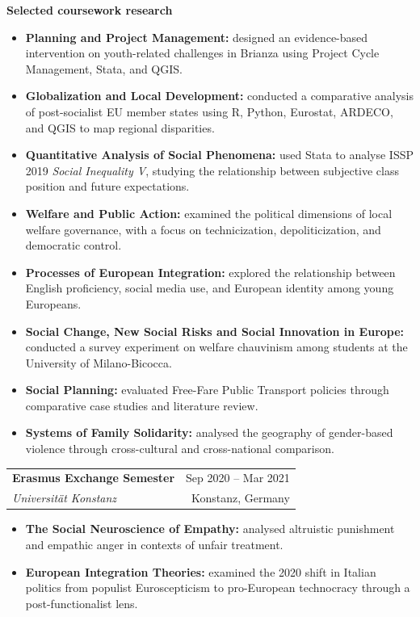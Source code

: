 \documentclass[11pt,a4paper]{article}
\makeatletter
\newcommand{\cventry}[4]{%
  \begin{tabularx}{\textwidth}{@{}Xr@{}}
    {\textbf{#1}} & {#4}\\
    {\emph{#2}} & {#3}
  \end{tabularx}\vspace{0.2em}
}
\makeatother
\begin{document}
\textbf{Selected coursework research}
\begin{itemize}
  \item \textbf{Planning and Project Management:} designed an evidence-based intervention on youth-related challenges in Brianza using Project Cycle Management, Stata, and QGIS.
  \item \textbf{Globalization and Local Development:} conducted a comparative analysis of post-socialist EU member states using R, Python, Eurostat, ARDECO, and QGIS to map regional disparities.
  \item \textbf{Quantitative Analysis of Social Phenomena:} used Stata to analyse ISSP 2019 \emph{Social Inequality V}, studying the relationship between subjective class position and future expectations.
  \item \textbf{Welfare and Public Action:} examined the political dimensions of local welfare governance, with a focus on technicization, depoliticization, and democratic control.
  \item \textbf{Processes of European Integration:} explored the relationship between English proficiency, social media use, and European identity among young Europeans.
  \item \textbf{Social Change, New Social Risks and Social Innovation in Europe:} conducted a survey experiment on welfare chauvinism among students at the University of Milano-Bicocca.
  \item \textbf{Social Planning:} evaluated Free-Fare Public Transport policies through comparative case studies and literature review.
  \item \textbf{Systems of Family Solidarity:} analysed the geography of gender-based violence through cross-cultural and cross-national comparison.
\end{itemize}

\cventry{Erasmus Exchange Semester}{Universit\"at Konstanz}{Konstanz, Germany}{Sep 2020 -- Mar 2021}
\begin{itemize}
  \item \textbf{The Social Neuroscience of Empathy:} analysed altruistic punishment and empathic anger in contexts of unfair treatment.
  \item \textbf{European Integration Theories:} examined the 2020 shift in Italian politics from populist Euroscepticism to pro-European technocracy through a post-functionalist lens.
\end{itemize}
\end{document}

